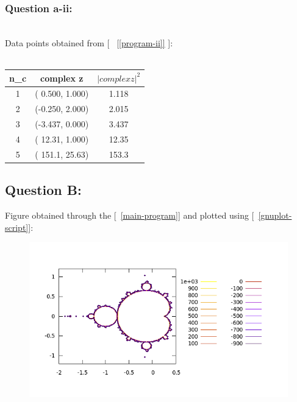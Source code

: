 \documentclass[twocolumn]{article}
\begin{document}
\subsubsection{Question a-ii:}
\\
Data points obtained from [{ ~\ref{[program-ii]} }]:\\
\\
\begin{tabular}{|c|c|c|}
\hline
n_c & complex z & $|complex z|^2$\\\hline
1 & ( 0.500,  1.000) & 1.118 \\\hline  
2 & (-0.250,  2.000) & 2.015 \\\hline  
3 & (-3.437,  0.000) & 3.437 \\\hline 
4 & ( 12.31,  1.000) & 12.35 \\\hline 
5 & ( 151.1,  25.63) & 153.3 \\\hline
\end{tabular}





\subsection{Question B:}

Figure obtained through the [{~\ref{main-program}}] and plotted using [~\ref{gnuplot-script}]:\\
\begin{figure}[!h]
\includegraphics[width=1.1\textwidth]{lab2.png}
\end{figure}
\end{document}
